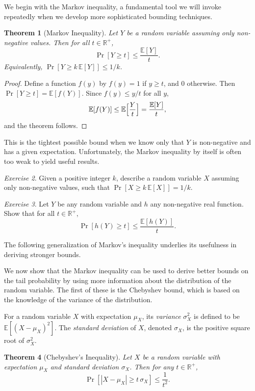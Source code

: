 \documentclass[twoside,12pt]{book}
\theoremstyle{plain}
\newtheorem{theorem}{Theorem}[chapter]
\theoremstyle{definition}
\theoremstyle{remark}
\newtheorem{exercise}[theorem]{Exercise}
\begin{document}
We begin with the Markov inequality, a fundamental tool we will invoke repeatedly when we develop more sophisticated bounding techniques.

\begin{theorem}[Markov Inequality]
\label{thm:markov}
Let $Y$ be a random variable assuming only non-negative values. Then for all $t \in \mathbb{R}^+$,
\[
\Pr[Y \geq t] \leq \frac{\mathbb{E}[Y]}{t}.
\]
Equivalently, $\Pr[Y \geq k\,\mathbb{E}[Y]] \leq 1/k$.
\end{theorem}

\begin{proof}
Define a function $f(y)$ by $f(y) = 1$ if $y \geq t$, and $0$ otherwise. Then $\Pr[Y \geq t] = \mathbb{E}[f(Y)]$. Since $f(y) \leq y/t$ for all $y$,
\[
\mathbb{E}[f(Y)] \leq \mathbb{E}\Bigl[\frac{Y}{t}\Bigr] = \frac{\mathbb{E}[Y]}{t},
\]
and the theorem follows.
\end{proof}

This is the tightest possible bound when we know only that $Y$ is non-negative and has a given expectation. Unfortunately, the Markov inequality by itself is often too weak to yield useful results.

\begin{exercise}
Given a positive integer $k$, describe a random variable $X$ assuming only non-negative values, such that $\Pr[X \geq k\,\mathbb{E}[X]] = 1/k$.
\end{exercise}

\begin{exercise}
Let $Y$ be any random variable and $h$ any non-negative real function. Show that for all $t \in \mathbb{R}^+$,
\[
\Pr[h(Y) \geq t] \leq \frac{\mathbb{E}[h(Y)]}{t}.
\]
\end{exercise}

The following generalization of Markov's inequality underlies its usefulness in deriving stronger bounds.

We now show that the Markov inequality can be used to derive better bounds on the tail probability by using more information about the distribution of the random variable. The first of these is the Chebyshev bound, which is based on the knowledge of the variance of the distribution.

For a random variable $X$ with expectation $\mu_X$, its \emph{variance} $\sigma_X^2$ is defined to be $\mathbb{E}[(X - \mu_X)^2]$. The \emph{standard deviation} of $X$, denoted $\sigma_X$, is the positive square root of $\sigma_X^2$.

\begin{theorem}[Chebyshev's Inequality]
\label{thm:chebyshev}
Let $X$ be a random variable with expectation $\mu_X$ and standard deviation $\sigma_X$. Then for any $t \in \mathbb{R}^+$,
\[
\Pr[|X - \mu_X| \geq t\,\sigma_X] \leq \frac{1}{t^2}.
\]
\end{theorem}
\end{document}
